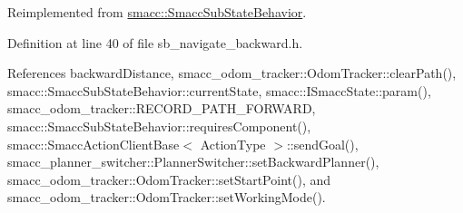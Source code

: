 Reimplemented from \hyperlink{classsmacc_1_1SmaccSubStateBehavior_a7c28e1c46238bbb2c2e0450573c6de94}{smacc\+::\+Smacc\+Sub\+State\+Behavior}.



Definition at line 40 of file sb\+\_\+navigate\+\_\+backward.\+h.



References backward\+Distance, smacc\+\_\+odom\+\_\+tracker\+::\+Odom\+Tracker\+::clear\+Path(), smacc\+::\+Smacc\+Sub\+State\+Behavior\+::current\+State, smacc\+::\+I\+Smacc\+State\+::param(), smacc\+\_\+odom\+\_\+tracker\+::\+R\+E\+C\+O\+R\+D\+\_\+\+P\+A\+T\+H\+\_\+\+F\+O\+R\+W\+A\+RD, smacc\+::\+Smacc\+Sub\+State\+Behavior\+::requires\+Component(), smacc\+::\+Smacc\+Action\+Client\+Base$<$ Action\+Type $>$\+::send\+Goal(), smacc\+\_\+planner\+\_\+switcher\+::\+Planner\+Switcher\+::set\+Backward\+Planner(), smacc\+\_\+odom\+\_\+tracker\+::\+Odom\+Tracker\+::set\+Start\+Point(), and smacc\+\_\+odom\+\_\+tracker\+::\+Odom\+Tracker\+::set\+Working\+Mode().


